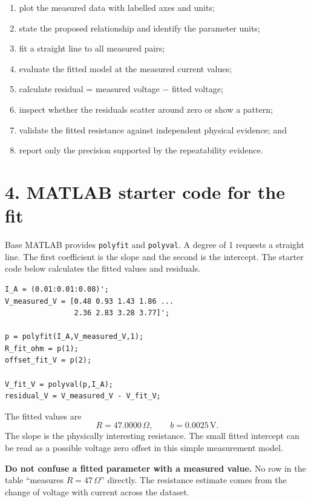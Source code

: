 \documentclass[11pt,a4paper]{article}
\newcommand{\units}[1]{\,\mathrm{#1}}
\begin{document}
\begin{enumerate}[nosep,leftmargin=7mm]
\item plot the measured data with labelled axes and units;
\item state the proposed relationship and identify the parameter units;
\item fit a straight line to all measured pairs;
\item evaluate the fitted model at the measured current values;
\item calculate residual = measured voltage $-$ fitted voltage;
\item inspect whether the residuals scatter around zero or show a pattern;
\item validate the fitted resistance against independent physical evidence; and
\item report only the precision supported by the repeatability evidence.
\end{enumerate}

\section*{4. MATLAB starter code for the fit}
Base MATLAB provides \texttt{polyfit} and \texttt{polyval}. A degree of 1 requests a straight line. The first coefficient is the slope and the second is the intercept. The starter code below calculates the fitted values and residuals.

\begin{lstlisting}[style=matlabstyle,caption={MATLAB fit and residual calculation for the supplied voltage--current data}]
I_A = (0.01:0.01:0.08)';
V_measured_V = [0.48 0.93 1.43 1.86 ...
                2.36 2.83 3.28 3.77]';

p = polyfit(I_A,V_measured_V,1);
R_fit_ohm = p(1);
offset_fit_V = p(2);

V_fit_V = polyval(p,I_A);
residual_V = V_measured_V - V_fit_V;
\end{lstlisting}

The fitted values are
\[
R=47.0000\,\Omega,
\qquad b=0.0025\units{V}.
\]
The slope is the physically interesting resistance. The small fitted intercept can be read as a possible voltage zero offset in this simple measurement model.

\begin{aibox}\textbf{Do not confuse a fitted parameter with a measured value.} No row in the table ``measures $R=47\,\Omega$'' directly. The resistance estimate comes from the change of voltage with current across the dataset.\end{aibox}
\end{document}
